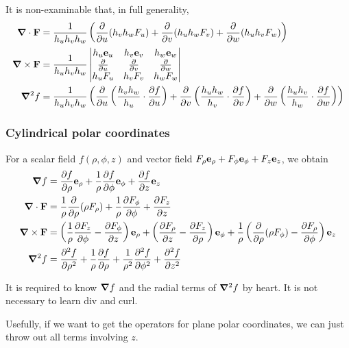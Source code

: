 \documentclass{../../template/note}
\begin{document}
    It is non-examinable that, in full generality,
    \begin{align*}
        \div \V F &= \frac{1}{h_uh_vh_w} \left(\pd{}{u}(h_vh_wF_u)+\pd{}{v}(h_uh_wF_v)+\pd{}{w}(h_uh_vF_w)\right) \\
        \curl \V F &= \frac{1}{h_uh_vh_w} \begin{vmatrix}
         h_u \V e_u & h_v \V e_v & h_w \V e_w \\
         \pd{}{u} & \pd{}{v} & \pd{}{w} \\
         h_uF_u & h_vF_v & h_wF_w \\
        \end{vmatrix} \\
        \grad^2 f &= \frac{1}{h_uh_vh_w} \left(\pd{}{u} \left(\frac{h_vh_w}{h_u} \cdot \pd{f}{u}\right) + \pd{}{v} \left(\frac{h_uh_w}{h_v} \cdot \pd{f}{v}\right) + \pd{}{w} \left(\frac{h_uh_v}{h_w} \cdot \pd{f}{w}\right)\right)
    \end{align*}
    
    

    \subsubsection{Cylindrical polar coordinates}
    
    For a scalar field \(f(\rho, \phi, z)\) and vector field \(F_\rho \V e_\rho + F_\phi \V e_\phi + F_z \V e_z\), we obtain
    \begin{align*}
        \grad f &= \pd f \rho \V e_\rho + \frac 1 \rho \pd f \phi \V e_\phi + \pd f z \V e_z \\
        \div \V F &= \frac 1 \rho \pd{}\rho(\rho F_\rho) + \frac 1 \rho \pd{F_\phi}{\phi} + \pd{F_z}{z} \\
        \curl \V F &= \left(\frac 1 \rho \pd{F_z}{\phi} - \pd{F_\phi}{z}\right)\V e_\rho + \left(\pd{F_\rho}z - \pd{F_z}\rho\right)\V e_\phi + \frac 1 \rho \left(\pd{}{\rho}(\rho F_\phi)-\pd{F_\rho}{\phi}\right)\V e_z \\
        \grad^2f &= \pd{^2f}{\rho^2} + \frac 1 \rho \pd{f}{\rho} + \frac 1 {\rho^2} \pd{^2f}{\phi^2} + \pd{^2f}{z^2}
    \end{align*}

    It is required to know \(\grad f\) and the radial terms of \(\grad^2 f\) by heart. It is not necessary to learn div and curl.
    
    Usefully, if we want to get the operators for plane polar coordinates, we can just throw out all terms involving \(z\).
\end{document}
